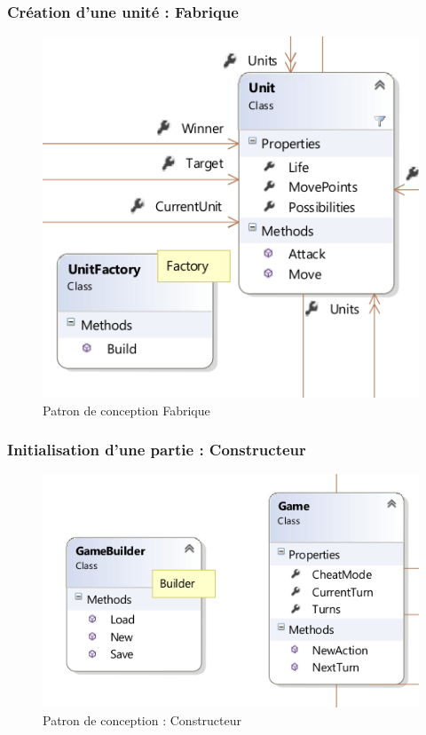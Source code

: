 \subsubsection{Création d'une unité : Fabrique}
\begin{figure}[h]
  \centering
  \includegraphics[width=13cm]{schemas/dp_factory.png}
  \caption{Patron de conception Fabrique}
  \label{fig:factory}
\end{figure}

\subsubsection{Initialisation d'une partie : Constructeur}
\begin{figure}[h]
  \centering
  \includegraphics[width=13cm]{schemas/dp_builder.png}
  \caption{Patron de conception : Constructeur}
  \label{fig:builder}
\end{figure}

